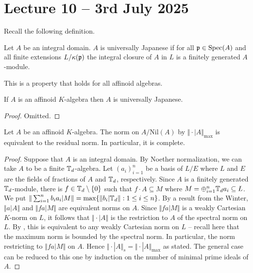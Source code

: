 \section{Lecture 10 -- 3rd July 2025}\label{sec: lecture 10}
Recall the following definition. 
\begin{definition}\label{def: universally Japanese}
    Let $A$ be an integral domain. $A$ is universally Japanese if for all $\mathfrak{p}\in\operatorname{Spec}(A)$ and all finite extensions $L/\kappa(\mathfrak{p})$ the integral closure of $A$ in $L$ is a finitely generated $A$-module. 
\end{definition}
This is a property that holds for all affinoid algebras. 
\begin{proposition}\label{prop: affinoid implies univ Jap}
    If $A$ is an affinoid $K$-algebra then $A$ is universally Japanese. 
\end{proposition}
\begin{proof}
    Omitted. 
\end{proof}
\begin{proposition}\label{prop: maximum norm is complete}
    Let $A$ be an affinoid $K$-algebra. The norm on $A/\mathrm{Nil}(A)$ by $\Vert\cdot|A\Vert_{\max}$ is equivalent to the residual norm. In particular, it is complete. 
\end{proposition}
\begin{proof}
    Suppose that $A$ is an integral domain. By Noether normalization, we can take $A$ to be a finite $\mathbb{T}_{d}$-algebra. Let $(a_{i})_{i=1}^{n}$ be a basis of $L/E$ where $L$ and $E$ are the fields of fractions of $A$ and $\mathbb{T}_{d}$, respectively. Since $A$ is a finitely generated $\mathbb{T}_{d}$-module, there is $f\in\mathbb{T}_{d}\setminus\{0\}$ such that $f\cdot A\subseteq M$ where $M=\oplus_{i=1}^{n}\mathbb{T}_{d}a_{i}\subseteq L$. We put $\Vert\sum_{i=1}^{n}b_{i}a_{i}|M\Vert=\max\{\Vert b_{i}|\mathbb{T}_{d}\Vert:1\leq i\leq n\}$. By a result from the Winter, $\Vert a|A\Vert$ and $\Vert fa|M\Vert$ are equivalent norms on $A$. Since $\Vert fa|M\Vert$ is a weakly Cartesian $K$-norm on $L$, it follows that $\Vert\cdot|A\Vert$ is the restriction to $A$ of the spectral norm on $L$. By , this is equivalent to any weakly Cartesian norm on $L$ -- recall here that the maximum norm is bounded by the spectral norm. In particular, the norm restricting to $\Vert fa|M\Vert$ on $A$. Hence $\Vert\cdot|A\Vert_{s}=\Vert\cdot|A\Vert_{\max}$ as stated. The general case can be reduced to this one by induction on the number of minimal prime ideals of $A$. 
\end{proof} %
